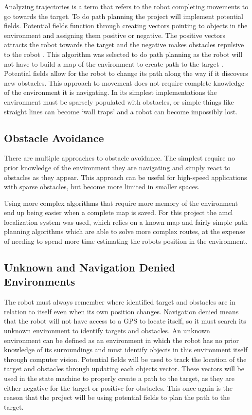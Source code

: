 \documentclass{article}[12]
\begin{document}
	Analyzing trajectories is a term that refers to the robot completing movements to go towards the target. To do path planning the project will implement potential fields. Potential fields function through creating vectors pointing to objects in the environment and assigning them positive or negative. The positive vectors attracts the robot towards the target and the negative makes obstacles repulsive to the robot \cite{hwang1992potential}. This algorithm was selected to do path planning as the robot will not have to build a map of the environment to create path to the target \cite{bortoff2000path}. Potential fields allow for the robot to change its path along the way if it discovers new obstacles. This approach to movement does not require complete knowledge of the environment it is navigating. In its simplest implementations the environment must be sparsely populated with obstacles, or simple things like straight lines can become `wall traps' and a robot can become impossibly lost.

	\subsection{Obstacle Avoidance}
	
	There are multiple approaches to obstacle avoidance. The simplest require no prior knowledge of the environment they are navigating and simply react to obstacles as they appear. This approach can be useful for high-speed applications with sparse obstacles, \cite{barry2018high} but become more limited in smaller spaces.
	
	Using more complex algorithms that require more memory of the environment end up being easier when a complete map is saved. For this project the amcl localization system was used, which relies on a known map and fairly simple path planning algorithms which are able to solve more complex routes, at the expense of needing to spend more time estimating the robots position in the environment.\cite{doucet_freitas_gordon_2001}

	\subsection{Unknown and Navigation Denied Environments}

	The robot must always remember where identified target and obstacles are in relation to itself even when its own position changes. Navigation denied means that the robot will not have access to a GPS to locate itself, so it must search its unknown environment to identify targets and obstacles. An unknown environment can be defined as an environment in which the robot has no prior knowledge of its surroundings and must identify objects in this environment itself through computer vision. Potential fields will be used to track the location of the target and obstacles through updating each objects vector. These vectors will be used in the state machine to properly create a path to the target, as they are either negative for the target or positive for obstacles. This once again is the reason that the project will be using potential fields to plan the path to the target. 
\end{document}
